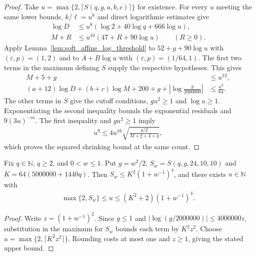 \begin{proof}\leanok
    Take $u=\max\{2,\lceil S(q,g,a,b,c)\rceil\}$ for existence.
    For every $u$ meeting the same lower bounds, $k/\ell=u^8$ and direct logarithmic estimates give
    \begin{align}
        \log D & \le u^8(\log2+40\log q+666\log u),      \\
        M+R    & \le u^{10}(47+R+90\log u)\qquad(R\ge0).
    \end{align}
    Apply Lemma~\ref{lem:soft_affine_log_threshold} to $52+g+90\log u$
    with $(\varepsilon,p)=(1,2)$ and to $A+B\log u$ with
    $(\varepsilon,p)=(1/64,1)$. The first two terms in the maximum
    defining $S$ supply the respective hypotheses. This gives
    \begin{align}
        M+5+g & \le u^{12},        \\
        (a+12)\log D+(b+c)\log M
        +200+g+\left|\log\frac{g}{2000000}\right|
              & \le\frac{u^9}{64}.
    \end{align}
    The other terms in $S$ give the cutoff conditions, $gu^2\ge1$ and
    $\log u\ge1$. Exponentiating the second inequality
    bounds the exponential residuals and $9(3u)^{-m}$. The first
    inequality and $gu^2\ge1$ imply
    \begin{align}
        u^9\le4u^{16}\sqrt{\frac{g/2}{M+\xi+4+g}},
    \end{align}
    which proves the squared shrinking bound at the same count.
\end{proof}

\begin{theorem}
    \label{thm:soft_family_quartic_scale}
    \leanok
    Fix $q\in\mathbb N$, $q\ge2$, and $0<w\le1$.
    Put $g=w^2/2$, $S_w=S(q,g,24,10,10)$ and $K=64(5000000+1440q)$.
    Then $S_w\le K^2(1+w^{-1})^4$, and there exists $u\in\mathbb N$ with
    \begin{align}
        \max\{2,S_w\}\le u\le(K^2+2)(1+w^{-1})^4.
        \label{eq:soft_family_quartic_scale}
    \end{align}
\end{theorem}
\begin{proof}\leanok
    Write $z=(1+w^{-1})^2$. Since $g\le1$ and
    $|\log(g/2000000)|\le4000000z$, substitution in the maximum for $S_w$
    bounds each term by $K^2z^2$. Choose $u=\max\{2,\lceil K^2z^2\rceil\}$.
    Rounding costs at most one and $z\ge1$, giving the stated upper bound.
\end{proof}

